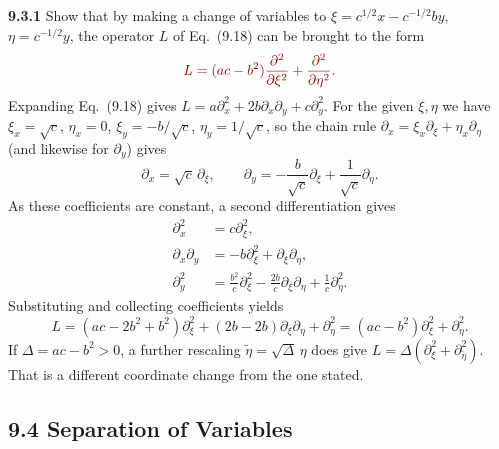 \par\bigskip
\noindent\textbf{9.3.1}\quad {}
Show that by making a change of variables to
$\xi=c^{1/2}x-c^{-1/2}by$, $\eta=c^{-1/2}y$, the operator $L$ of Eq.~(9.18)
can be brought to the form
\[
\erratum{L=(ac-b^{2})\frac{\partial^{2}}{\partial\xi^{2}}
+\frac{\partial^{2}}{\partial\eta^{2}}.}
\]
\solution
{}
Expanding Eq.~(9.18) gives
$L=a\partial_x^2+2b\partial_x\partial_y+c\partial_y^2$.
For the given $\xi,\eta$ we have $\xi_x=\sqrt c$, $\eta_x=0$,
$\xi_y=-b/\sqrt c$, $\eta_y=1/\sqrt c$, so the chain rule
$\partial_x=\xi_x\partial_\xi+\eta_x\partial_\eta$ (and likewise for
$\partial_y$) gives
\[
\partial_x=\sqrt c\,\partial_\xi,\qquad
\partial_y=-\frac b{\sqrt c}\partial_\xi
            +\frac1{\sqrt c}\partial_\eta.
\]
As these coefficients are constant, a second differentiation gives
\begin{align*}
\partial_x^2&=c\partial_\xi^2,\\
\partial_x\partial_y&=-b\partial_\xi^2+\partial_\xi\partial_\eta,\\
\partial_y^2&=\frac{b^2}{c}\partial_\xi^2
 -\frac{2b}{c}\partial_\xi\partial_\eta+\frac1c\partial_\eta^2.
\end{align*}
Substituting and collecting coefficients yields
\[
L=(ac-2b^2+b^2)\partial_\xi^2
 +(2b-2b)\partial_\xi\partial_\eta+\partial_\eta^2
=\boxed{(ac-b^2)\partial_\xi^2+\partial_\eta^2}.
\]
If $\Delta=ac-b^2>0$, a further rescaling
$\widetilde\eta=\sqrt\Delta\,\eta$ does give
$L=\Delta(\partial_\xi^2+\partial_{\widetilde\eta}^2)$.
That is a different coordinate change from the one stated.


\subsection*{9.4 Separation of Variables}

